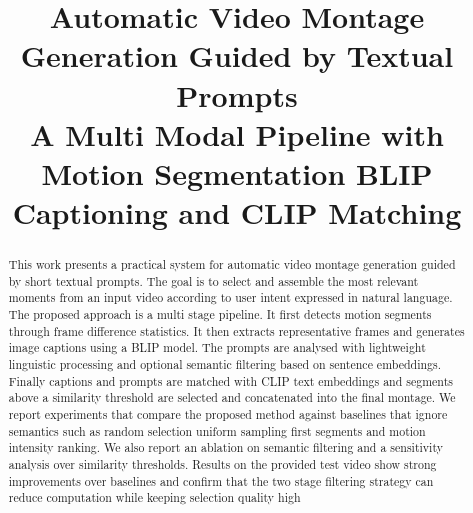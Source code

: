 \documentclass[conference,compsoc]{IEEEtran}
\begin{document}
%
\title{Automatic Video Montage Generation Guided by Textual Prompts\\
A Multi Modal Pipeline with Motion Segmentation BLIP Captioning and CLIP Matching}


\author{
}


\maketitle

\begin{abstract}
This work presents a practical system for automatic video montage generation guided by short textual prompts. The goal is to select and assemble the most relevant moments from an input video according to user intent expressed in natural language. The proposed approach is a multi stage pipeline. It first detects motion segments through frame difference statistics. It then extracts representative frames and generates image captions using a BLIP model. The prompts are analysed with lightweight linguistic processing and optional semantic filtering based on sentence embeddings. Finally captions and prompts are matched with CLIP text embeddings and segments above a similarity threshold are selected and concatenated into the final montage. We report experiments that compare the proposed method against baselines that ignore semantics such as random selection uniform sampling first segments and motion intensity ranking. We also report an ablation on semantic filtering and a sensitivity analysis over similarity thresholds. Results on the provided test video show strong improvements over baselines and confirm that the two stage filtering strategy can reduce computation while keeping selection quality high
\end{abstract}
\end{document}

